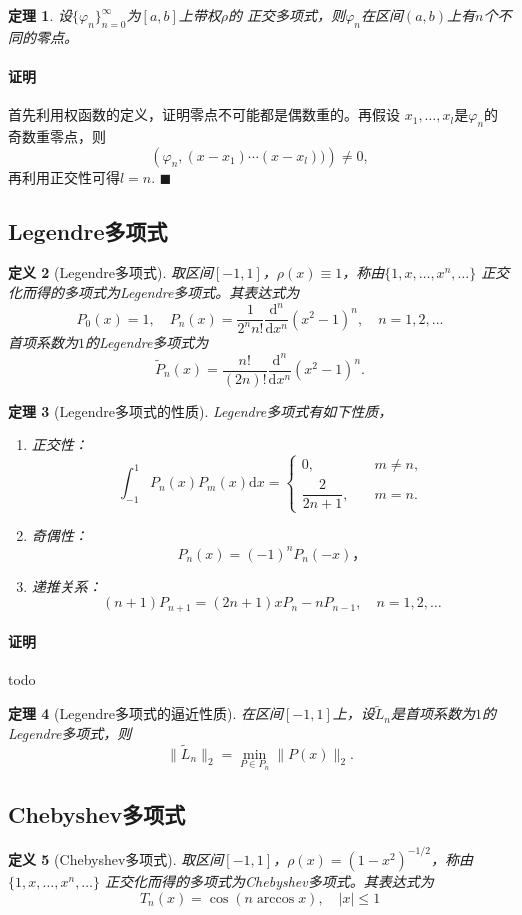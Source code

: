 \documentclass[12pt, a4paper]{article}
\theoremstyle{margin}
\newtheorem{thm}{定理}
\newtheorem{defi}[thm]{定义}
\newcommand{\rd}{\mathrm{d}}
\newcommand{\proof}{\paragraph{证明}}
\begin{document}
  \begin{thm}
    设$\{\varphi_n\}_{n=0}^\infty$为$[a, b]$上带权$\rho$的
    正交多项式，则$\varphi_n$在区间$(a, b)$上有$n$个不同的零点。
  \end{thm}
  \proof
    首先利用权函数的定义，证明零点不可能都是偶数重的。再假设
    $x_1,\dots,x_l$是$\varphi_n$的奇数重零点，则
    \[
      \left(\varphi_n, (x-x_1)\cdots(x-x_l)) \right) \ne 0,
    \]
    再利用正交性可得$l=n$. $\blacksquare$

\newpage
\subsection{Legendre多项式}
  \begin{defi}[Legendre多项式]
    取区间$[-1, 1]$，$\rho(x)\equiv1$，称由$\{1,x,\dots,x^n,\dots\}$
    正交化而得的多项式为Legendre多项式。其表达式为
    \[
      P_0(x) = 1,\quad
      P_n(x) = \frac{1}{2^nn!}\frac{\rd^n}{\rd x^n}(x^2-1)^n,
      \quad n=1,2,\dots
    \]
    首项系数为$1$的Legendre多项式为
    \[
      \widetilde{P}_n(x) = \frac{n!}{(2n)!}\frac{\rd^n}{\rd x^n}(x^2-1)^n.
    \]
  \end{defi}

  \begin{thm}[Legendre多项式的性质]
    Legendre多项式有如下性质，
    \begin{enumerate}
      \item 正交性：
      \[
        \int_{-1}^1 P_n(x)P_m(x)\rd x =
        \begin{cases}
            0, &\quad m\ne n, \\
            \dfrac{2}{2n+1},&\quad m = n.
        \end{cases}
      \]
      \item 奇偶性：
        \[P_n(x) = (-1)^nP_n(-x)，\]
      \item 递推关系：
      \[
        (n+1)P_{n+1} = (2n+1)xP_n - nP_{n-1},\quad
        n = 1, 2,\dots
      \]
    \end{enumerate}
  \end{thm}
  \proof todo

  \begin{thm}[Legendre多项式的逼近性质]
    在区间$[-1, 1]$上，设$\widetilde{L}_n$是首项系数为$1$的
    Legendre多项式，则
    \[
      \|\widetilde{L}_n\|_2 = \min_{P\in P_n}\|P(x)\|_2.
    \]
  \end{thm}

\newpage
\subsection{Chebyshev多项式}
  \begin{defi}[Chebyshev多项式]
    取区间$[-1, 1]$，$\rho(x)=(1-x^2)^{-1/2}$，称由$\{1,x,\dots,x^n,\dots\}$
    正交化而得的多项式为Chebyshev多项式。其表达式为
    \[
      T_n(x) = \cos(n\arccos x),\quad|x|\le 1
    \]
  \end{defi}
\end{document}
